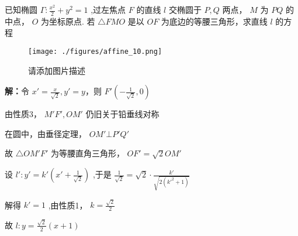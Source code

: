 \begin{example}{}
已知椭圆 $\displaystyle{\Gamma:\frac{x^2}{2}+y^2=1}$ ,过左焦点 $\displaystyle{F}$ 的直线 $\displaystyle{l}$ 交椭圆于 $\displaystyle{P,Q}$ 两点， $\displaystyle{M}$ 为 $\displaystyle{PQ}$ 的中点， $\displaystyle{O}$ 为坐标原点. 若 $\displaystyle{\triangle FMO}$ 是以 $\displaystyle{OF}$ 为底边的等腰三角形，求直线 $\displaystyle{l}$  的方程
\begin{figure}[ht]
\centering
\texttt{[image: ./figures/affine\_10.png]}
\caption{请添加图片描述} \label{affine_fig10}
\end{figure}
\textbf{解：}令 $\displaystyle{x'=\frac{x}{\sqrt{2}},y'=y}$，则 $\displaystyle{F'(-\frac{1}{\sqrt{2}},0)}$

由性质3， $\displaystyle{M'F',OM'}$ 仍旧关于铅垂线对称

在圆中，由垂径定理， $\displaystyle{OM'\bot P'Q'}$

故 $\displaystyle{\triangle OM'F'}$ 为等腰直角三角形， $\displaystyle{OF'=\sqrt{2} OM'}$

设 $\displaystyle{l':y'=k'\left(x'+\frac{1}{\sqrt{2}}\right)}$ ,于是 $\displaystyle{\frac{1}{\sqrt{2}}=\sqrt{2}\cdot \frac{k'}{\sqrt{2(k'^2+1)}}}$

解得 $\displaystyle{k'=1}$ ,由性质1， $\displaystyle{k=\frac{\sqrt{2}}{2}}$

故 $\displaystyle{l:y=\frac{\sqrt{2}}{2}(x+1)}$ 
\end{example}

